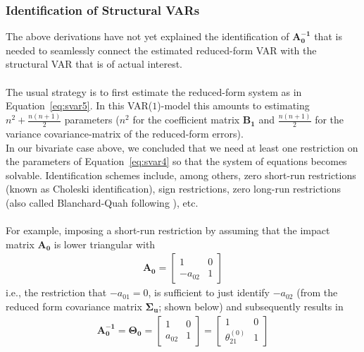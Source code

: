 \documentclass[a4paper,11pt,listof=nochaptergap,oneside,pointednumbers,bibtotoc,bigheadings,liststotoc]{scrbook}
\theoremstyle{mysatz}
\theoremstyle{mydefinition}
\theoremstyle{mybemerkung}
\renewcommand*{\paragraph}[1]{\subsubsection*{#1} \vspace{-3mm}} %
\newcommand{\vect}[1]{\boldsymbol{\mathbf{#1}}}
\begin{document}
\paragraph{Identification of Structural VARs}
The above derivations have not yet explained the identification of $\vect{A_0^{-1}}$ that is needed to seamlessly connect the estimated reduced-form VAR with the structural VAR that is of actual interest. \\
\\
The usual strategy is to first estimate the reduced-form system as in Equation~\ref{eq:svar5}. In this VAR($1$)-model this amounts to estimating $n^2 + \frac{n(n+1)}{2}$ parameters ($n^2$ for the coefficient matrix $\vect{B_1}$ and $\frac{n(n+1)}{2}$ for the variance covariance-matrix of the reduced-form errors). 
\\
In our bivariate case above, we concluded that we need at least one restriction on the parameters of Equation~\ref{eq:svar4} so that the system of equations becomes solvable. Identification schemes include, among others, zero short-run restrictions (known as Choleski identification), sign restrictions, zero long-run restrictions (also called Blanchard-Quah following \citealp{blanchardandquah:89}), etc.\\
\\
For example, imposing a short-run restriction by assuming that the impact matrix $\vect{A_0}$ is lower triangular with
\begin{equation} \label{eq:svar11}
\begin{split}
 		\vect{A_0} = 	\begin{bmatrix}
    					1 & 0 \\
					-a_{02} & 1
 					\end{bmatrix}
\end{split}								
\end{equation}
i.e., the restriction that $-a_{01}=0$, is sufficient to just identify $-a_{02}$ (from the reduced form covariance matrix $\vect{\Sigma_u}$; shown below) and subsequently results in 
\begin{equation} \label{eq:svar12}
\begin{split}
 		\vect{A_0^{-1}} = \vect{\Theta_0} = 	
					\begin{bmatrix}
    					1 & 0 \\
					a_{02} & 1
 					\end{bmatrix} = 
						\begin{bmatrix}
    						1 & 0 \\
						\theta_{21}^{(0)} & 1
 						\end{bmatrix}
\end{split}								
\end{equation}
\end{document}
